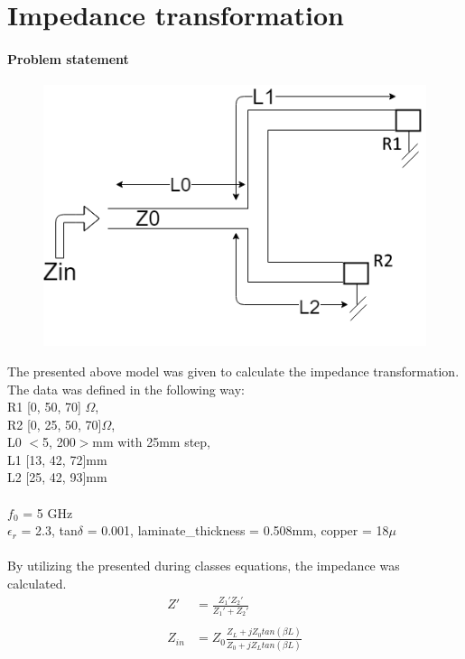 \documentclass[eng,printmode]{mgr}
\begin{document}
\chapter{Impedance transformation}
\subsubsection{Problem statement}
\begin{figure}[h]
	\centering
	\includegraphics[width=0.7\linewidth]{impedance}
	\label{fig:impedance}
\end{figure}
\noindent
The presented above model was given to calculate the impedance transformation.
The data was defined in the following way:\\
R1 [0, 50, 70] $\Omega$,\\
R2 [0, 25, 50, 70]$\Omega$,\\
L0 $<$5, 200$>$mm with 25mm step,\\
L1 [13, 42, 72]mm\\
L2 [25, 42, 93]mm\\
\\
$f_0$ = 5 GHz\\
$\epsilon _r$ = 2.3,  tan$\delta$ = 0.001, laminate\_thickness = 0.508mm, copper = 18$\mu$
\\
\\
By utilizing the presented during classes equations, the impedance was calculated.\\
\begin{align*}
Z' &= \frac{Z_1 ' Z_2 '}{Z_1 ' + Z_2 '}\\
\\
Z_{in} &= Z_0 \frac{Z_L + jZ_0tan(\beta L)}{Z_0 + jZ_Ltan(\beta L)}
\end{align*}
\end{document}
